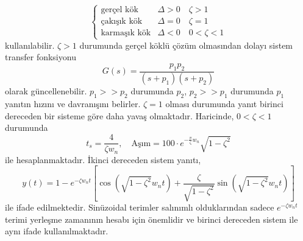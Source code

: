 \begin{equation}
    \begin{cases}
        \text{gerçel kök}& \Delta>0\quad \zeta>1\\
        \text{çakışık kök}& \Delta=0\quad \zeta=1\\
        \text{karmaşık kök}& \Delta<0\quad 0<\zeta<1
    \end{cases}
\end{equation}
kullanılabilir. $\zeta>1$ durumunda gerçel köklü çözüm olmasından dolayı sistem transfer fonksiyonu
\begin{equation}
    G(s)=\frac{p_1 p_2}{(s+p_1)(s+p_2)}
\end{equation}
olarak güncellenebilir. $p_1>>p_2$ durumunda $p_2$, $p_2>>p_1$ durumunda $p_1$ yanıtın hızını ve davranışını belirler. $\zeta=1$ olması durumunda yanıt birinci dereceden bir sisteme göre daha yavaş olmaktadır. Haricinde, $0<\zeta<1$ durumunda 
\begin{equation} 
    t_s=\frac{4}{\zeta w_n},\quad \text{Aşım}=100\cdot e^{-\frac\pi\zeta w_n}{\sqrt{1-\zeta^2}}
\end{equation} 
ile hesaplanmaktadır. İkinci dereceden sistem yanıtı,
\begin{equation}
    y(t)=1-e^{-\zeta w_nt}\left[\cos(\sqrt{1-\zeta^2}w_nt)+\frac{\zeta}{\sqrt{1-\zeta^2}}\sin(\sqrt{1-\zeta^2}w_nt)\right]
\end{equation}
ile ifade edilmektedir. Sinüzoidal terimler salınımlı olduklarından sadece $e^{-\zeta w_nt}$ terimi yerleşme zamanının hesabı için önemlidir ve birinci dereceden sistem ile aynı ifade kullanılmaktadır.